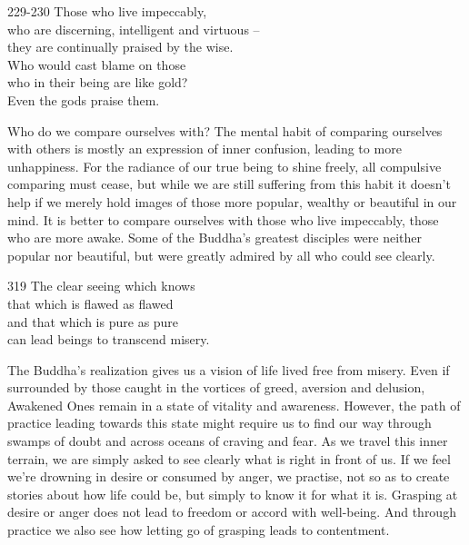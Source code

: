 
\begin{dhpVerse}{229-230}
\label{dhp-229}\label{dhp-230}
Those who live impeccably,\\
who are discerning, intelligent and virtuous --\\
they are continually praised by the wise.\\
Who would cast blame on those\\
who in their being are like gold?\\
Even the gods praise them.
\end{dhpVerse}

\begin{dhpRefl}
  Who do we compare ourselves with? The mental habit of comparing ourselves with
  others is mostly an expression of inner confusion, leading to more
  unhappiness. For the radiance of our true being to shine freely, all
  compulsive comparing must cease, but while we are still suffering from this
  habit it doesn’t help if we merely hold images of those more popular, wealthy
  or beautiful in our mind. It is better to compare ourselves with those who
  live impeccably, those who are more awake. Some of the Buddha’s greatest
  disciples were neither popular nor beautiful, but were greatly admired by all
  who could see clearly.
\end{dhpRefl}


\begin{dhpVerse}{319}
\label{dhp-319}
The clear seeing which knows\\
that which is flawed as flawed\\
and that which is pure as pure\\
can lead beings to transcend misery.
\end{dhpVerse}

\begin{dhpRefl}
  The Buddha’s realization gives us a vision of life lived free from misery.
  Even if surrounded by those caught in the vortices of greed, aversion and
  delusion, Awakened Ones remain in a state of vitality and awareness. However,
  the path of practice leading towards this state might require us to find our
  way through swamps of doubt and across oceans of craving and fear. As we
  travel this inner terrain, we are simply asked to see clearly what is right in
  front of us. If we feel we’re drowning in desire or consumed by anger, we
  practise, not so as to create stories about how life could be, but simply to
  know it for what it is. Grasping at desire or anger does not lead to freedom
  or accord with well-being. And through practice we also see how letting go of
  grasping leads to contentment.
\end{dhpRefl}

